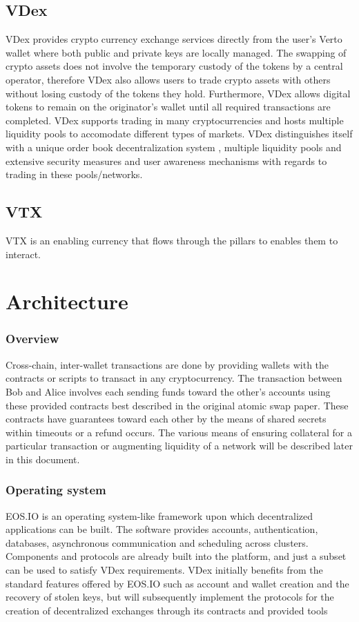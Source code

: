 \documentclass[]{article}
\begin{document}
{\subsection {VDex}

VDex provides crypto currency exchange services directly from the user's Verto wallet where both public and private keys are locally managed.
The swapping of crypto assets does not involve the temporary custody of the tokens by a central operator, 
therefore VDex also allows users to trade crypto assets with others without losing custody of the tokens they hold. 
Furthermore, VDex allows digital tokens to remain on the originator's wallet until all required transactions are completed. 
VDex supports trading in many cryptocurrencies and hosts multiple liquidity pools to accomodate different types of markets.
VDex distinguishes itself with a unique order book decentralization system
, multiple liquidity pools and extensive security measures and user awareness mechanisms with regards to trading in these pools/networks.

\subsection {VTX}
VTX is an enabling currency that flows through the pillars to enables them to interact.

									
\section{Architecture}
	
	\subsubsection{Overview}
	Cross-chain, inter-wallet transactions are done by providing wallets with the contracts or scripts to transact in any cryptocurrency. 
	The transaction between Bob and Alice involves each sending funds toward the other's accounts 
	using these provided contracts best described in the original atomic swap paper.\cite{22} 
	These contracts have guarantees toward each other by the means of shared secrets within timeouts or a refund occurs. 
	The various means of ensuring collateral for a particular transaction or augmenting liquidity of a network 
	will be described later in this document.
  
	\subsubsection{Operating system}
	EOS.IO is an operating system-like framework upon which decentralized applications can be built. 
	The software provides accounts, authentication, databases, asynchronous communication and scheduling across clusters. 
	Components and protocols are already built into the platform, and just a subset can be used to satisfy VDex requirements. 
	VDex initially benefits from the standard features offered by EOS.IO such as account and wallet creation 
	and the recovery of stolen keys, but will subsequently implement the protocols 
	for the creation of decentralized exchanges through its contracts and provided tools	\cite{3}\\
  
}
\end{document}
